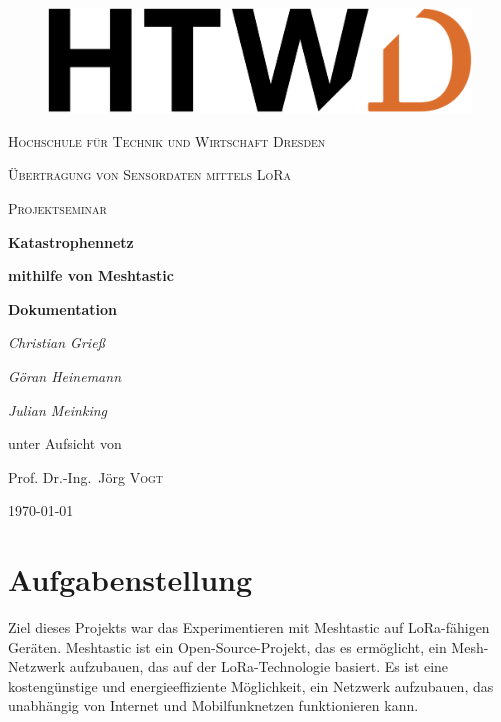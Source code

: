 \documentclass[12pt,a4paper]{article}
\author{Christian Grieß}
\begin{document}
\begin{titlepage}
\begin{figure}
	\centering \includegraphics[scale=0.5]{./Bilder/HTWLogo/HTWD.png}
\end{figure}


	\centering
	{\scshape\LARGE Hochschule für Technik und Wirtschaft Dresden \par}
	\vspace{2cm}
	{\scshape\Large Übertragung von Sensordaten mittels LoRa\par}
	\vspace{0cm}
	{\scshape\Large Projektseminar \par}
	\vspace{1.5cm}
	{\huge\bfseries Katastrophennetz\par}
	{\huge\bfseries mithilfe von Meshtastic\par}
	\vspace{1.5cm}
	{\huge\bfseries {Dokumentation}\par}
	\vspace{4cm}
	{\Large\itshape Christian Grieß\par}
	{\Large\itshape Göran Heinemann\par}
	{\Large\itshape Julian Meinking\par}
	\vfill
	unter Aufsicht von\par %
	Prof. Dr.-Ing.~Jörg \textsc{Vogt}

	\vfill

	{\large \today\par}
\end{titlepage}
\newpage
\tableofcontents

\newpage
\section{Aufgabenstellung}

Ziel dieses Projekts war das Experimentieren mit Meshtastic auf LoRa-fähigen Geräten.
Meshtastic ist ein Open-Source-Projekt, das es ermöglicht, ein Mesh-Netzwerk aufzubauen, das auf der LoRa-Technologie basiert.
Es ist eine kostengünstige und energieeffiziente Möglichkeit, ein Netzwerk aufzubauen, das unabhängig von Internet und
Mobilfunknetzen funktionieren kann.
\end{document}
